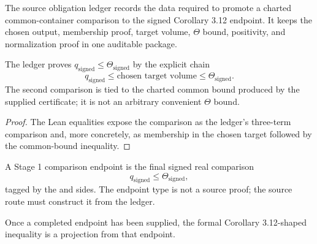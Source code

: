 \begin{definition}
  \label{def:source-obligation-ledger}
  \leanok
  The source obligation ledger records the data required to promote a
  charted common-container comparison to the signed Corollary 3.12 endpoint.
  It keeps the chosen output, membership proof, target volume, \(\Theta\) bound,
  \qPilot{} positivity, and normalization proof in one auditable package.
\end{definition}

\begin{lemma}
  \label{lem:ledger-three-term-comparison}
  \leanok
  The ledger proves \(q_{\mathrm{signed}}\le\Theta_{\mathrm{signed}}\) by the
  explicit chain
  \[
    q_{\mathrm{signed}}
      \le \text{chosen target volume}
      \le \Theta_{\mathrm{signed}}.
  \]
  The second comparison is tied to the charted common bound produced by the
  supplied certificate; it is not an arbitrary convenient \(\Theta\) bound.
\end{lemma}

\begin{proof}
  The Lean equalities expose the comparison as the ledger's three-term
  comparison and, more concretely, as membership in the chosen target followed
  by the common-bound inequality.
\end{proof}

\begin{definition}
  \label{def:stage1-comparison-endpoint}
  \leanok
  A Stage 1 comparison endpoint is the final signed real comparison
  \[
    q_{\mathrm{signed}} \le \Theta_{\mathrm{signed}},
  \]
  tagged by the \qPilot{} and \ThetaPilot{} sides.  The endpoint type is not a
  source proof; the source route must construct it from the ledger.
\end{definition}

\begin{lemma}
  \label{lem:projection-warning}
  \leanok
  Once a completed endpoint has been supplied, the formal Corollary
  3.12-shaped inequality is a projection from that endpoint.
\end{lemma}


